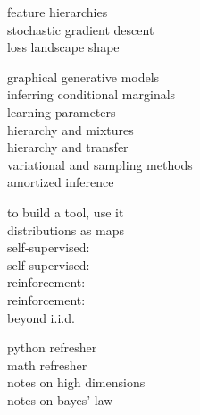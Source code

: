 \documentclass[11pt, justified]{tufte-book}
\newcommand{\phdot}{\phantom{.}}
\theoremstyle{definition}
\begin{document}
{\begin{description}
\begin{description}
          \item[feature hierarchies] \phdot %
          \item[stochastic gradient descent] \phdot %
          \item[loss landscape shape] \phdot %
        \end{description}
      \item[structured inference] \phdot
        \begin{description}
          \item[graphical generative models] \phdot %
          \item[inferring conditional marginals] \phdot
          \item[learning parameters] \phdot %
          \item[hierarchy and mixtures] \phdot
          \item[hierarchy and transfer] \phdot
          \item[variational and sampling methods] \phdot %
          \item[amortized inference] \phdot %
        \end{description}
      \item[reductions to supervision] \phdot
        \begin{description}
          \item[to build a tool, use it] \phdot
          \item[distributions as maps] \phdot
          \item[self-supervised: ] \phdot
          \item[self-supervised: ] \phdot
          \item[reinforcement: ] \phdot
          \item[reinforcement: ] \phdot
          \item[beyond i.i.d.] \phdot
        \end{description}
      \item[appendices] \phdot 
        \begin{description}
          \item[python refresher] \phdot
          \item[math refresher] \phdot
          \item[notes on high dimensions] \phdot
          \item[notes on bayes' law] \phdot
        \end{description}
    \end{description}
  }
   
\end{document}
